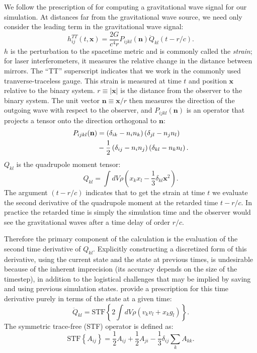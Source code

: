 \documentclass[12pt]{article}
\begin{document}
We follow the prescription of \citet{blanchet:1990} for computing a gravitational wave 
signal for our simulation. At distances far from the 
gravitational wave source, we need only consider the leading term in the gravitational 
wave signal:
\begin{equation}
  h^{TT}_{ij}(t,\mathbf{x}) = \frac{2G}{c^4 r}P_{ijkl}(\mathbf{n}) \ddot{Q}_{kl}(t - r/c).
\end{equation}
$h$ is the perturbation to the spacetime metric and is commonly called the \textit{strain}; 
for laser interferometers, it measures the relative change in the distance between mirrors. 
The ``TT'' superscript indicates that we work in the commonly used tranverse-traceless gauge.
This strain is measured at time $t$ and position $\mathbf{x}$ relative to the binary system.
$r\equiv |\mathbf{x}|$ is the distance from the observer to the binary system. The unit vector 
$\mathbf{n} \equiv \mathbf{x} / r$ then measures the direction of the outgoing wave with 
respect to the observer, and $P_{ijkl}(\mathbf{n})$ is an operator that projects a tensor 
onto the direction orthogonal to $\mathbf{n}$:
\begin{align}
  P_{ijkl}(\mathbf{n}) &= \left(\delta_{ik} - n_i n_k\right)\left(\delta_{jl} - n_j n_l\right) \notag \\
                      &- \frac{1}{2}\left(\delta_{ij} - n_i n_j\right)\left( \delta_{kl} - n_k n_l\right).
\end{align}
$Q_{kl}$ is the quadrupole moment tensor:
\begin{equation}
  Q_{kl} = \int dV \rho \left(x_k x_l - \frac{1}{3}\delta_{kl} \mathbf{x}^2\right).
\end{equation}
The argument $(t - r/c)$ indicates that to get the strain at time $t$ we evaluate the second derivative of the 
quadrupole moment at the retarded time $t - r/c$. In practice the retarded time is simply the simulation time
and the observer would see the gravitational waves after a time delay of order $r/c$.

Therefore the primary component of the calculation is the evaluation of the second time derivative of $Q_{kl}$.
Explicitly constructing a discretized form of this derivative, using the current state and the state at 
previous times, is undesirable because of the inherent imprecision (its accuracy depends on the size of the timestep),
in addition to the logistical challenges that may be implied by saving and using previous simulation states. 
\citet{blanchet:1990} provide a prescription for this time derivative purely in terms of the state at a given time:
\begin{equation}
  \ddot{Q}_{kl} = \text{STF}\left\{2\int dV \rho (v_k v_l + x_k g_l)\right\}.
\end{equation}
The symmetric trace-free (STF) operator is defined as:
\begin{equation}
  \text{STF}\left\{A_{ij}\right\} = \frac{1}{2}A_{ij} + \frac{1}{2}A_{ji} - \frac{1}{3} \delta_{ij} \sum_{k}A_{kk}.
\end{equation}
\end{document}
